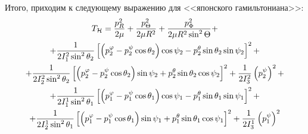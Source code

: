 \documentclass[14pt]{extarticle}
\newcommand{\If}{I_1^2}
\newcommand{\Is}{I_2^2}
\newcommand{\It}{I_3^2}
\newcommand{\Iff}{I_1^1}
\newcommand{\Iss}{I_2^1}
\newcommand{\Itt}{I_3^1}
\newcommand{\lb}{\left(}
\newcommand{\rb}{\right)}
\newcommand{\lsq}{\left[}
\newcommand{\rsq}{\right]}
\begin{document}
Итого, приходим к следующему выражению для <<японского гамильтониана>>:
\begin{gather}
	T_\mathcal{H} = \frac{p_R^2}{2 \mu} + \frac{p_\Theta^2}{2 \mu R^2} + \frac{p_\Phi^2}{2 \mu R^2 \sin^2 \Theta} + \notag \\
	+ \frac{1}{2 \If \sin^2 \theta_2} \lsq \lb p_2^\varphi - p_2^\psi \cos \theta_2 \rb \cos \psi_2 - p_2^\theta \sin \theta_2 \sin \psi_2 \rsq^2 + \notag \\
	+ \frac{1}{2 \Is \sin^2 \theta_2} \lsq \lb p_2^\varphi - p_2^\psi \cos \theta_2 \rb \sin \psi_2 + p_2^\theta \sin \theta_2 \cos \psi_2 \rsq^2 + \frac{1}{2 \It} \lb p_2^\psi \rb^2 + \notag \\
	+ \frac{1}{2 \Iff \sin^2 \theta_1} \lsq \lb p_1^\varphi - p_1^\psi \cos \theta_1 \rb \cos \psi_1 - p_1^\theta \sin \theta_1 \sin \psi_1 \rsq^2 + \notag \\
	+ \frac{1}{2 \Iss \sin^2 \theta_1} \lsq \lb p_1^\varphi - p_1^\psi \cos \theta_1 \rb \sin \psi_1 + p_1^\theta \sin \theta_1 \cos \psi_1 \rsq^2 + \frac{1}{2 \Itt} \lb p_1^\psi \rb^2 \notag
\end{gather}
\end{document}
